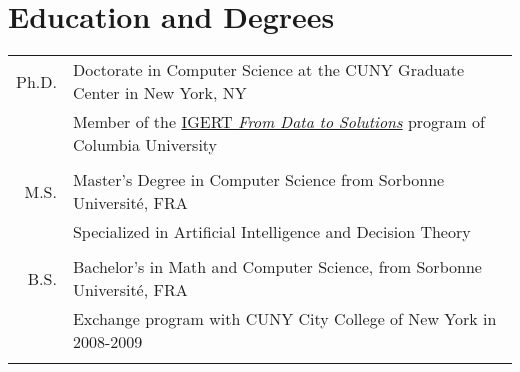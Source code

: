 \documentclass[a4paper,10pt]{article}
\begin{document}
\section{Education and Degrees}
    \vspace{0.2cm}
    \begin{tabular}{r|p{160mm}} 
        Ph.D. & Doctorate in Computer Science at the CUNY Graduate Center in New York, NY\\
        \hphantom{\textbf{Hunter}} & \small{Member of the \href{http://www.cs.columbia.edu/igert/people_students.shtml}{IGERT {\em From Data to Solutions}} program of Columbia University}\\
        \multicolumn{2}{c}{} \vspace{-1.5mm} \\

        M.S. & Master's Degree in Computer Science from Sorbonne Université, FRA \\
        & \small{Specialized in Artificial Intelligence and Decision Theory}\\
        \multicolumn{2}{c}{} \vspace{-1.5mm} \\
         
        B.S. & Bachelor's in Math and Computer Science, from Sorbonne Université, FRA \\ 
        & \small{Exchange program with CUNY City College of New York in 2008-2009}\\
        \multicolumn{2}{c}{} \vspace{-1.5mm} \\
         
         

    \end{tabular}
\end{document}
